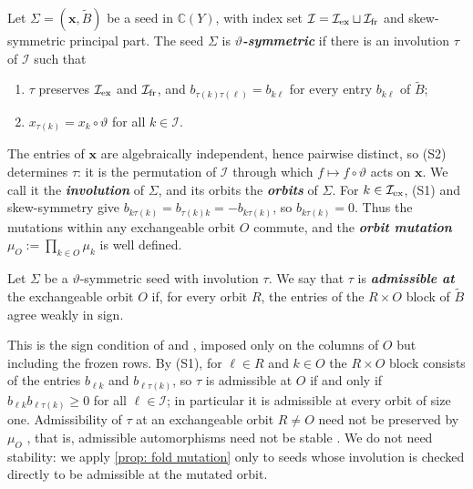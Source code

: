\documentclass[a4paper]{amsart}
\numberwithin{equation}{section}
\theoremstyle{definition}
\theoremstyle{remark}
\newcommand{\bbC}{\mathbb{C}}
\newcommand{\mcI}{\mathcal{I}}
\newcommand{\bx}{\mathbf{x}}
\newcommand{\tB}{\widetilde{B}}
\newcommand{\vt}{\vartheta}
\newcommand{\ex}{{\rm ex}}
\newcommand{\fr}{{\rm fr}}
\newcommand{\newword}[1]{\textbf{\emph{#1}}}
\begin{document}
\begin{definition}
  \label{def: symmetric seed}
  Let $\Sigma=(\bx,\tB)$ be a seed in $\bbC(Y)$, with index set $\mcI=\mcI_\ex\sqcup\mcI_\fr$ and skew-symmetric principal part.
  The seed $\Sigma$ is \newword{$\vt$-symmetric} if there is an involution $\tau$ of $\mcI$ such that
  \begin{enumerate}[(S1)]
    \item $\tau$ preserves $\mcI_\ex$ and $\mcI_\fr$, and $b_{\tau(k)\tau(\ell)}=b_{k\ell}$ for every entry $b_{k\ell}$ of $\tB$;
    \item $x_{\tau(k)}=x_k\circ\vt$ for all $k\in\mcI$.
  \end{enumerate}
\end{definition}

The entries of $\bx$ are algebraically independent, hence pairwise distinct, so (S2) determines $\tau$: it is the permutation of $\mcI$ through which $f\mapsto f\circ\vt$ acts on $\bx$.
We call it the \newword{involution} of $\Sigma$, and its orbits the \newword{orbits} of $\Sigma$.
For $k\in\mcI_\ex$, (S1) and skew-symmetry give $b_{k\tau(k)}=b_{\tau(k)k}=-b_{k\tau(k)}$, so $b_{k\tau(k)}=0$.
Thus the mutations within any exchangeable orbit $O$ commute, and the \newword{orbit mutation} $\mu_O:=\prod_{k\in O}\mu_k$ is well defined.

\begin{definition}
  \label{def: admissible}
  Let $\Sigma$ be a $\vt$-symmetric seed with involution $\tau$. We say that $\tau$ is \newword{admissible at} the exchangeable orbit $O$ if, for every orbit $R$, the entries of the $R\times O$ block of $\tB$ agree weakly in sign.
\end{definition}

This is the sign condition of \cite[(5.2)]{NS14} and \cite[Definition~2.3.2(ii)]{Vie18}, imposed only on the columns of $O$ but including the frozen rows.
By (S1), for $\ell\in R$ and $k\in O$ the $R\times O$ block consists of the entries $b_{\ell k}$ and $b_{\ell\tau(k)}$, so $\tau$ is admissible at $O$ if and only if $b_{\ell k}b_{\ell\tau(k)}\ge0$ for all $\ell\in\mcI$; in particular it is admissible at every orbit of size one.
Admissibility of $\tau$ at an exchangeable orbit $R\neq O$ need not be preserved by $\mu_O$ \cite[Remark~2.18]{Dup08}, that is, admissible automorphisms need not be stable \cite[Definition~2.3.4]{Vie18}. We do not need stability: we apply \cref{prop: fold mutation} only to seeds whose involution is checked directly to be admissible at the mutated orbit.
\end{document}
